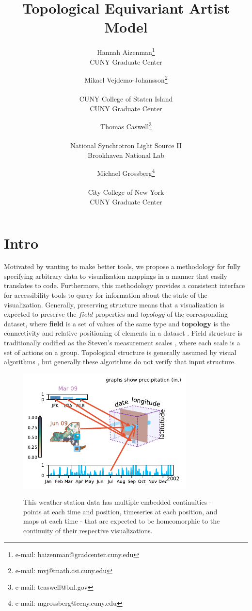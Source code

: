 \documentclass[preprint]{vgtc}
\title{Topological Equivariant Artist Model}
\author{
Hannah Aizenman\thanks{e-mail: haizenman@gradcenter.cuny.edu} \\
\scriptsize{CUNY Graduate Center}
\and
Mikael Vejdemo-Johansson\thanks{e-mail: mvj@math.csi.cuny.edu} \\
\parbox{1.6in}{\scriptsize \centering CUNY College of Staten Island \\
CUNY Graduate Center}
\and
Thomas Caswell\thanks{e-mail: tcaswell@bnl.gov} \\
\parbox{1.8in}{\scriptsize\centering National Synchrotron Light Source II \\ Brookhaven National Lab}
\and
Michael Grossberg\thanks{e-mail: mgrossberg@ccny.cuny.edu} \\
\parbox{1.6in}{\scriptsize\centering City College of New York \\ CUNY Graduate Center}
}
\begin{document}
\maketitle

\section{Intro}
\label{sec:intro}

Motivated by wanting to make better tools, we propose a methodology for fully specifying arbitrary data to visualization mappings in a manner that easily translates to code. Furthermore, this methodology provides a consistent interface for accessibility tools to query for information about the state of the visualization. Generally, preserving structure means that a visualization is expected to preserve the $field$ properties and $topology$ of the corresponding dataset, where \textcolor{fiber}{\textbf{field}} is a set of values of the same type and \textcolor{base}{\textbf{topology}} is the connectivity and relative positioning of elements in a dataset \cite{wilkinsonGrammarGraphics2005}.  Field structure is traditionally codified as the Steven's measurement scales \cite{stevensTheoryScalesMeasurement1946}, where each scale is a set of actions on a group. Topological structure is generally assumed by visual algorithms \cite{chiTaxonomyVisualizationTechniques2000, toryRethinkingVisualizationHighlevel2004}, but generally these algorithms do not verify that input structure.
\begin{figure}[!h]
\begin{center}
    \includegraphics[width=3.5in, alt={Data cube illustrating index space with map, timeseries, and bar charts visualizing slices of the data.}]{k_different_types.pdf}
\end{center}
\caption{This weather station data has multiple embedded continuities - points at each time and position, timeseries at each position, and maps at each time - that are expected to be homeomorphic to the continuity of their respective visualizations.}
    \label{fig:homeomorphism}
\end{figure}
\end{document}
